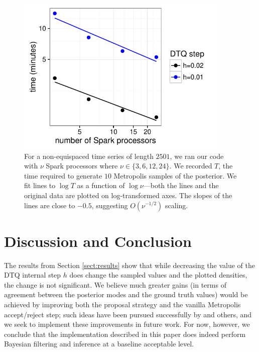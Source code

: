 \documentclass[wcp]{jmlr}
\begin{document}
\begin{figure}[th]
\begin{center}
\includegraphics[width=4in]{scaling2}
\end{center}
\vspace{-0.25in}
\caption{For a non-equispaced time series of length $2501$, we ran our code with $\nu$ Spark
  processors where $\nu \in \{3,6,12,24\}$.  We recorded $T$, the time required to generate
  $10$ Metropolis samples of the posterior.  We fit lines to $\log T$ as a function of $\log
  \nu$---both the lines and the original data are plotted on
  log-transformed axes.  The slopes of the lines are close to $-0.5$, suggesting $O(\nu^{-1/2})$ scaling.}
\label{fig:scaling2}
\end{figure}

\section{Discussion and Conclusion}
\label{sect:conclusion}
The results from Section \ref{sect:results}
show that while decreasing the value of the DTQ internal step $h$ does
change the sampled values and the plotted densities, the change is not
significant.  We believe much greater gains (in terms of agreement
between the posterior modes and the ground truth values) would be achieved by
improving both the proposal strategy and the vanilla Metropolis
accept/reject step; such ideas have been pursued successfully by \citet{fuchs2013inference} and others, and we seek
to implement these improvements in future work.  For now, however, we
conclude that the implementation described in this paper does indeed
perform Bayesian filtering and inference at a baseline acceptable
level.
\end{document}
